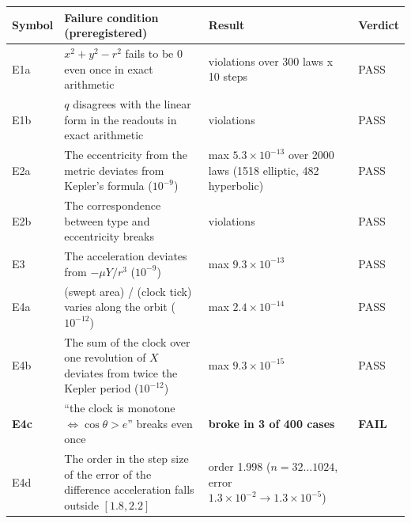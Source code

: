\documentclass[
  a4paper,
]{article}
\newcounter{none} %
\begin{document}
{\def\LTcaptype{none} %
\begin{longtable}[]{@{}
  >{\raggedright\arraybackslash}p{}
  >{\raggedright\arraybackslash}p{}
  >{\raggedright\arraybackslash}p{}
  >{\raggedright\arraybackslash}p{}@{}}
\toprule\noalign{}
\begin{minipage}[b]{\linewidth}\raggedright
Symbol
\end{minipage} & \begin{minipage}[b]{\linewidth}\raggedright
Failure condition (preregistered)
\end{minipage} & \begin{minipage}[b]{\linewidth}\raggedright
Result
\end{minipage} & \begin{minipage}[b]{\linewidth}\raggedright
Verdict
\end{minipage} \\
\midrule\noalign{}
\endhead
\bottomrule\noalign{}
\endlastfoot
E1a & \(x^2+y^2-r^2\) fails to be 0 even once in exact arithmetic & 0
violations over 300 laws x 10 steps & PASS \\
E1b & \(q\) disagrees with the linear form in the readouts in exact
arithmetic & 0 violations & PASS \\
E2a & The eccentricity from the metric deviates from Kepler's formula
(\(10^{-9}\)) & max \(5.3\times10^{-13}\) over 2000 laws (1518 elliptic,
482 hyperbolic) & PASS \\
E2b & The correspondence between type and eccentricity breaks & 0
violations & PASS \\
E3 & The acceleration deviates from \(-\mu Y/r^3\) (\(10^{-9}\)) & max
\(9.3\times10^{-13}\) & PASS \\
E4a & (swept area) / (clock tick) varies along the orbit (\(10^{-12}\))
& max \(2.4\times10^{-14}\) & PASS \\
E4b & The sum of the clock over one revolution of \(X\) deviates from
twice the Kepler period (\(10^{-12}\)) & max \(9.3\times10^{-15}\) &
PASS \\
\textbf{E4c} & ``the clock is monotone \(\iff\cos\theta>e\)'' breaks
even once & \textbf{broke in 3 of 400 cases} & \textbf{FAIL} \\
E4d & The order in the step size of the error of the difference
acceleration falls outside \([1.8,2.2]\) & order 1.998
(\(n=32\ldots1024\), error \(1.3\times10^{-2}\to1.3\times10^{-5}\)) &

\end{longtable}}
\end{document}
